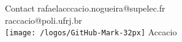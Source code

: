 \begin{frame}{Contact}
\small \flushright
rafaelacccacio.nogueira@supelec.fr
\\raccacio@poli.ufrj.br\\
\texttt{[image: /logos/GitHub-Mark-32px]} Accacio
\end{frame}